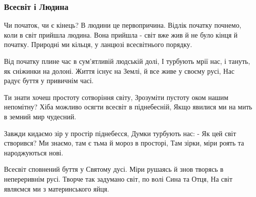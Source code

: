  
 
 

\subsubsection{Всесвіт і Людина}

Чи початок, чи є кінець? В людини це первопричина.
Відлік початку почнемо, коли в світ прийшла людина.
Вона прийшла - світ вже жив й не було кінця й початку.
Природні ми кільця, у ланцюзі всесвітнього порядку.

Від початку плине час в сум'ятливій людській долі,
І турбують мрії нас, і тануть, як сніжинки на долоні.
Життя існує на Землі, й все живе у своєму русі,
Нас радує буття у привичнім часі.

Ти знати хочеш простоту сотворіння світу,
Зрозуміти пустоту оком нашим непомітну?
Хіба можливо осягти всесвіт в піднебесній,
Якщо явилися ми на мить в земний мир чудесний.

Завжди кидаємо зір у простір піднебесся,
Думки турбують нас: - Як цей світ створився?
Ми знаємо, там є тьма й мороз в просторі,
Там зірки, міри роять та народжуються нові.

Всесвіт сповнений буття у Святому дусі.
Міри рушаясь й знов творясь в непереривнім русі.
Творче так задумано світ, по волі Сина та Отця,
На світ являємся ми з материнського яйця. 
